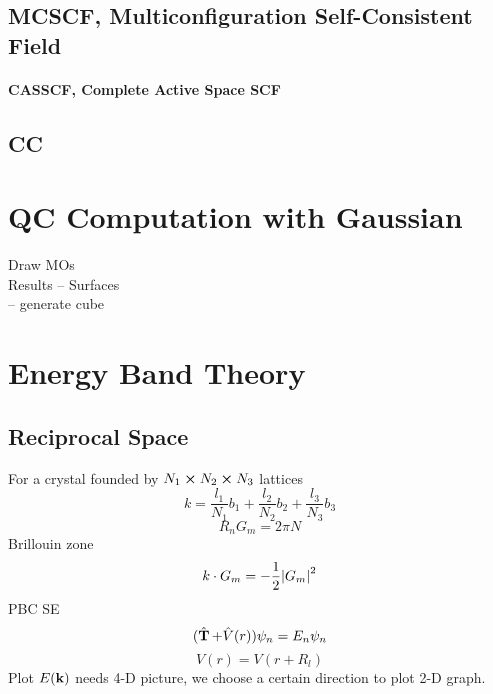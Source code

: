 \documentclass[a4paper]{article}
\DeclareMathOperator{\hT}{\hat{\vb{T}}}
\numberwithin{equation}{section}
\begin{document}
\subsection{MCSCF, Multiconfiguration Self-Consistent Field}
\paragraph{CASSCF, Complete Active Space SCF}

\subsection{CC}

\section{QC Computation with Gaussian}
Draw MOs\\
Results -- Surfaces\\
-- generate cube\\

\section{Energy Band Theory}
\subsection{}
\subsection{Reciprocal Space}
For a crystal founded by $ N_1\cross N_2\cross N_3 $ lattices
\begin{equation}\label{key}
k = \dfrac{l_1}{N_1}b_1 + \dfrac{l_2}{N_2}b_2 + \dfrac{l_3}{N_3}b_3
\end{equation}
\begin{equation}\label{key}
R_n G_m = 2\pi N
\end{equation}
Brillouin zone
\begin{equation}\label{key}
k\cdot G_m = -\dfrac{1}{2}\abs{G_m}^2
\end{equation}
PBC SE
\begin{equation}\label{key}
(\hT + \hat{V}(r))\psi_n = E_n \psi_n
\end{equation}
\begin{equation}\label{key}
V(r) = V(r + R_l)
\end{equation}
Plot $ E(\vb{k}) $ needs 4-D picture, we choose a certain direction to plot 2-D graph.
\end{document}
